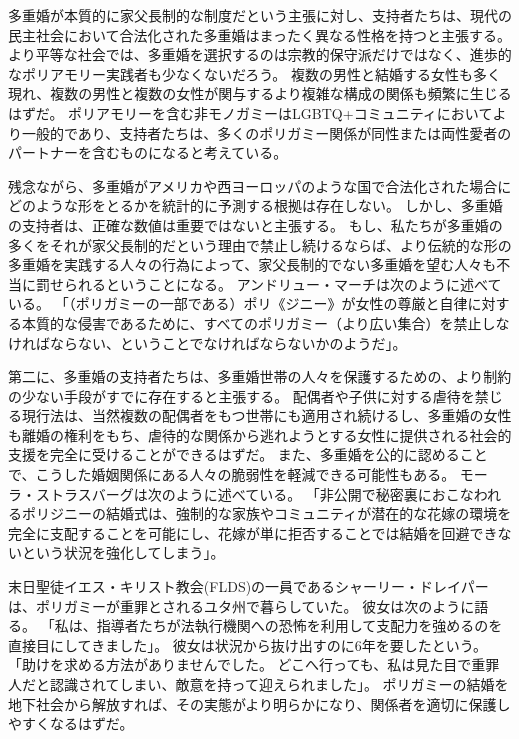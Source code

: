 \documentclass[paper=a4,book,openany]{jlreq}
\begin{document}
多重婚が本質的に家父長制的な制度だという主張に対し、支持者たちは、現代の民主社会において合法化された多重婚はまったく異なる性格を持つと主張する。
より平等な社会では、多重婚を選択するのは宗教的保守派だけではなく、進歩的なポリアモリー実践者も少なくないだろう。
複数の男性と結婚する女性も多く現れ、複数の男性と複数の女性が関与するより複雑な構成の関係も頻繁に生じるはずだ。
ポリアモリーを含む非モノガミーはLGBTQ+コミュニティにおいてより一般的であり、支持者たちは、多くのポリガミー関係が同性または両性愛者のパートナーを含むものになると考えている。

残念ながら、多重婚がアメリカや西ヨーロッパのような国で合法化された場合にどのような形をとるかを統計的に予測する根拠は存在しない。
しかし、多重婚の支持者は、正確な数値は重要ではないと主張する。
もし、私たちが多重婚の多くをそれが家父長制的だという理由で禁止し続けるならば、より伝統的な形の多重婚を実践する人々の行為によって、家父長制的でない多重婚を望む人々も不当に罰せられるということになる。
アンドリュー・マーチは次のように述べている。
「（ポリガミーの一部である）ポリ《ジニー》が女性の尊厳と自律に対する本質的な侵害であるために、すべてのポリガミー（より広い集合）を禁止しなければならない、ということでなければならないかのようだ」\citep{march11:_is_there_right_polyg}。

第二に、多重婚の支持者たちは、多重婚世帯の人々を保護するための、より制約の少ない手段がすでに存在すると主張する。
配偶者や子供に対する虐待を禁じる現行法は、当然複数の配偶者をもつ世帯にも適用され続けるし、多重婚の女性も離婚の権利をもち、虐待的な関係から逃れようとする女性に提供される社会的支援を完全に受けることができるはずだ。
また、多重婚を公的に認めることで、こうした婚姻関係にある人々の脆弱性を軽減できる可能性もある。
モーラ・ストラスバーグは次のように述べている。
「非公開で秘密裏におこなわれるポリジニーの結婚式は、強制的な家族やコミュニティが潜在的な花嫁の環境を完全に支配することを可能にし、花嫁が単に拒否することでは結婚を回避できないという状況を強化してしまう」\citep[p.369 fn.116.5]{strassberg02:_crime_polyg}。

末日聖徒イエス・キリスト教会(FLDS)の一員であるシャーリー・ドレイパーは、ポリガミーが重罪とされるユタ州で暮らしていた。
彼女は次のように語る。
「私は、指導者たちが法執行機関への恐怖を利用して支配力を強めるのを直接目にしてきました」。
彼女は状況から抜け出すのに6年を要したという。
「助けを求める方法がありませんでした。
どこへ行っても、私は見た目で重罪人だと認識されてしまい、敵意を持って迎えられました」\citep{smardon20:_polyg_is_decrim_utah}。
ポリガミーの結婚を地下社会から解放すれば、その実態がより明らかになり、関係者を適切に保護しやすくなるはずだ。
\end{document}
